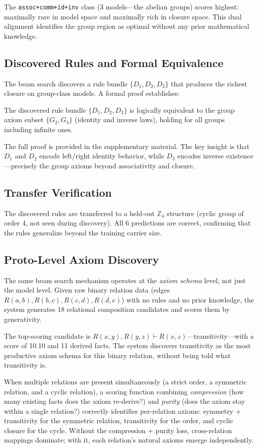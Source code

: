 The \texttt{assoc+comm+id+inv} class (3 models---the abelian groups) scores highest: maximally rare in model space and maximally rich in closure space. This dual alignment identifies the group region as optimal without any prior mathematical knowledge.

\subsection{Discovered Rules and Formal Equivalence}

The beam search discovers a rule bundle $\{D_1, D_2, D_3\}$ that produces the richest closure on group-class models. A formal proof establishes:

\begin{theorem}
The discovered rule bundle $\{D_1, D_2, D_3\}$ is logically equivalent to the group axiom subset $\{G_2, G_3\}$ (identity and inverse laws), holding for all groups including infinite ones.
\end{theorem}

\noindent The full proof is provided in the supplementary material. The key insight is that $D_1$ and $D_2$ encode left/right identity behavior, while $D_3$ encodes inverse existence---precisely the group axioms beyond associativity and closure.

\subsection{Transfer Verification}

The discovered rules are transferred to a held-out $\mathbb{Z}_4$ structure (cyclic group of order 4, not seen during discovery). All 6 predictions are correct, confirming that the rules generalize beyond the training carrier size.

\subsection{Proto-Level Axiom Discovery}

The same beam search mechanism operates at the \emph{axiom schema} level, not just the model level. Given raw binary relation data (edges $R(a,b), R(b,c), R(c,d), R(d,e)$) with no rules and no prior knowledge, the system generates 18 relational composition candidates and scores them by generativity.

The top-scoring candidate is $R(x,y), R(y,z) \vdash R(x,z)$---transitivity---with a score of 10.10 and 11 derived facts. The system discovers transitivity as the most productive axiom schema for this binary relation, without being told what transitivity is.

When multiple relations are present simultaneously (a strict order, a symmetric relation, and a cyclic relation), a scoring function combining \emph{compression} (how many existing facts does the axiom re-derive?) and \emph{purity} (does the axiom stay within a single relation?) correctly identifies per-relation axioms: symmetry + transitivity for the symmetric relation, transitivity for the order, and cyclic closure for the cycle. Without the compression + purity loss, cross-relation mappings dominate; with it, each relation's natural axioms emerge independently.
